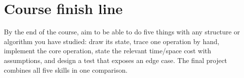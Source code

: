\section*{Course finish line}

\begin{recommendedworkflow}
By the end of the course, aim to be able to do five things with any structure or algorithm you have studied: draw its state, trace one operation by hand, implement the core operation, state the relevant time/space cost with assumptions, and design a test that exposes an edge case. The final project combines all five skills in one comparison.
\end{recommendedworkflow}
